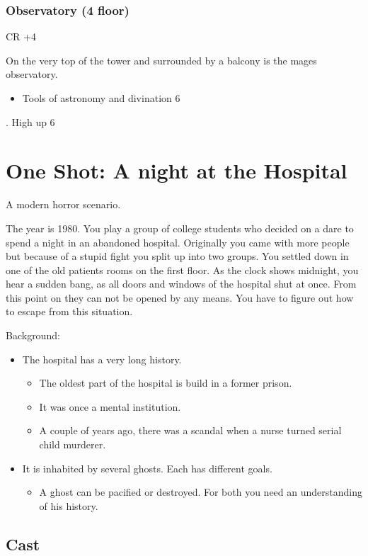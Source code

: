 \documentclass[11pt]{article}
\begin{document}
{\subsubsection{Observatory (4 floor)}
\label{sec:orgf64083c}
CR +4

On the very top of the tower and surrounded by a balcony is the mages observatory.

\begin{itemize}
\item Tools of astronomy and divination 6
\end{itemize}
. High up 6
\section{One Shot: A night at the Hospital}
\label{sec:orgcdd9419}

A modern horror scenario.

The year is 1980. You play a group of college students who decided on a dare to spend a night in an abandoned hospital. Originally you came with more people but because of a stupid fight you split up into two groups. You settled down in one of the old patients rooms on the first floor. As the clock shows midnight, you hear a sudden bang, as all doors and windows of the hospital shut at once. From this point on they can not be opened by any means. You have to figure out how to escape from this situation. 

Background:
\begin{itemize}
\item The hospital has a very long history.
\begin{itemize}
\item The oldest part of the hospital is build in a former prison.
\item It was once a mental institution.
\item A couple of years ago, there was a scandal when a nurse turned serial child murderer.
\end{itemize}
\item It is inhabited by several ghosts. Each has different goals.
\begin{itemize}
\item A ghost can be pacified or destroyed. For both you need an understanding of his history.
\end{itemize}
\end{itemize}
\subsection{Cast}
\label{sec:orgb67f6d9}

}
\end{document}
